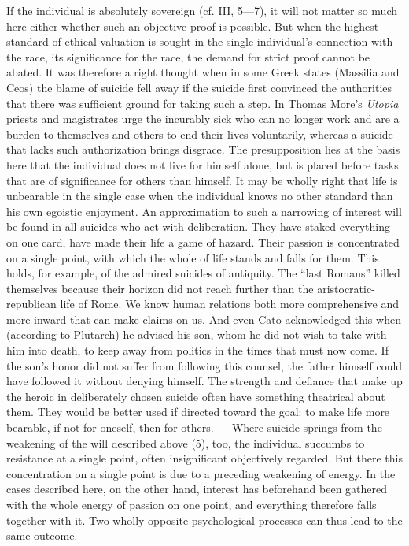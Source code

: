 \documentclass[12pt,a4paper,openany]{book}
\newcommand{\opage}[1]{\marginnote{\footnotesize\textit{[#1]}}}
\begin{document}
If the individual is absolutely sovereign (cf. III, 5---7), it will not matter so much here either whether such an
objective proof is possible. But when the highest standard of ethical valuation is sought in the single
individual's connection with the race, its significance for the race, the demand for strict proof cannot be
abated.
It was
\opage{216}therefore a right thought when in some Greek states (Massilia and Ceos) the blame of suicide fell away if
the suicide first convinced the authorities that there was sufficient ground for taking such a step. In Thomas
More's \textit{Utopia} priests and magistrates urge the incurably sick who can no longer work and are a burden to
themselves and others to end their lives voluntarily, whereas a suicide that lacks such authorization brings
disgrace. The presupposition lies at the basis here that the individual does not live for himself alone, but is
placed before tasks that are of significance for others than himself. It may be wholly right that life is
unbearable in the single case when the individual knows no other standard than his own egoistic enjoyment. An
approximation to such a narrowing of interest will be found in all suicides who act with deliberation. They have
staked everything on one card, have made their life a game of hazard. Their passion is concentrated on a single
point, with which the whole of life stands and falls for them. This holds, for example, of the admired suicides of
antiquity. The ``last Romans'' killed themselves because their horizon did not reach further than the
aristocratic-republican life of Rome. We know human relations both more comprehensive and more inward that can
make claims on us. And even Cato acknowledged this when (according to Plutarch) he advised his son, whom he did not
wish to take with him into death, to keep away from politics in the times that must now come. If the son's honor
did not suffer from following this counsel, the father himself could have followed it without denying himself.
The strength and defiance that make up the heroic in deliberately chosen suicide often have something theatrical
about them. They would be better used if directed toward the goal: to make life more bearable, if not for
oneself, then for others. --- Where suicide springs from the weakening of the will described above (5), too, the
individual succumbs to resistance at a single point, often insignificant objectively regarded. But there this
concentration on a single point is due to a preceding weakening of energy. In the cases described here, on the
other hand, interest has beforehand been gathered with the whole
\opage{217}energy of passion on one point, and everything therefore falls together with it. Two wholly opposite
psychological processes can thus lead to the same outcome.
\end{document}
